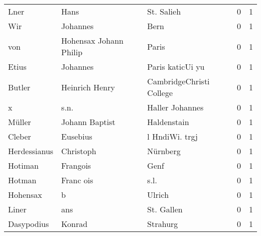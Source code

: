 \documentclass[10pt,a4paper,landscape]{article}
\begin{document}
\begin{longtable}{llllrr}
                     Lner &                               Hans &             &                                  St. Salieh &          0 &         1 \\
                      Wir &                           Johannes &             &                                        Bern &          0 &         1 \\
                      von &             Hohensax Johann Philip &             &                                       Paris &          0 &         1 \\
                    Etius &                           Johannes &             &                            Paris katicUi yu &          0 &         1 \\
                   Butler &                     Heinrich Henry &             &                    CambridgeChristi College &          0 &         1 \\
                        x &                               s.n. &             &                             Haller Johannes &          0 &         1 \\
                   Müller &                     Johann Baptist &             &                                 Haldenstain &          0 &         1 \\
                   Cleber &                           Eusebius &             &                              l HndiWi. trgj &          0 &         1 \\
             Herdessianus &                          Christoph &             &                                    Nürnberg &          0 &         1 \\
                  Hotiman &                           Frangois &             &                                        Genf &          0 &         1 \\
                   Hotman &                          Franc ois &             &                                        s.l. &          0 &         1 \\
                 Hohensax &                                  b &             &                                      Ulrich &          0 &         1 \\
                    Liner &                                ans &             &                                  St. Gallen &          0 &         1 \\
               Dasypodius &                             Konrad &             &                                    Strahurg &          0 &         1 \\

\end{longtable}
\end{document}
